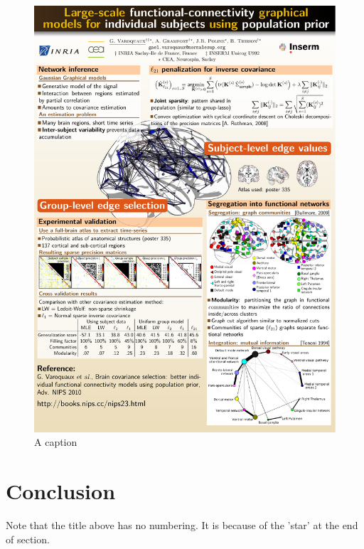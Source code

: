 \documentclass{article}
\begin{document}
\begin{figure}
\center
    \includegraphics[width=0.8\linewidth]{poster_hbm2011}
\caption{A caption}
\end{figure}

\section*{Conclusion}

Note that the title above has no numbering. It is because of the 'star'
at the end of section.
\end{document}
